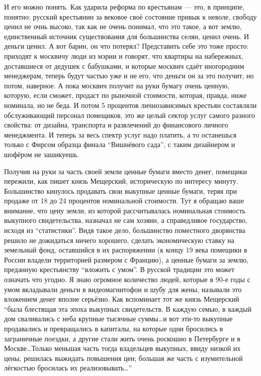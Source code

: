 И его можно понять. Как ударила реформа по крестьянам --- это, в принципе,
понятно: русский крестьянин за вековое своё состояние привык к неволе, свободу
ценил не очнь высоко, так как не очень понимал, что это такое, а вот землю,
единственный источник существования для большинства селян, ценил очень. И деньги
ценил. А вот барин, он что потерял? Представить себе это тоже просто: приходят к
москвичу люди из мэрии и говорят, что квартиры на набережных, доставшиеся от
дедушек с бабушками, и  которые москвич сдаёт иногородним менеджерам, теперь
будут частью уже и не его, что деньги он за это получит, но потом, наверное.
А пока москвич получит на руки бумагу очень ценную, которую, если сможет,
продаст по рыночной стоимости, которая, правда, ниже номинала, но не беда. И
потом 5 процентов личнозависимых крестьян составляли обслуживающий персонал
помещиков, это же целый сектор услуг самого разного свойства: от дизайна,
транспорта и развлечений до финансового личного менеджмента. И теперь за весь
спектр услуг надо платить, а то останешься только с Фирсом образца финала
\enquote{Вишнёвого сада}, с таким дизайнером и шофёром не зашикуешь.

Получив на руки за часть своей земли ценные бумаги вместо денег, помещики
пережили, как пишет князь Мещерский, историческую по интересу минуту.
Большинство кинулось продавать свои выкупные ценные бумаги, теряя при продаже
от 18 до 24 процентов номинальной стоимости. Тут я обращаю ваше внимание, что
цену земли, из которой рассчитывалась номинальная стоимость выкупного
свидетельства, назначал не сам хозяин, а справедливое государство, исходя из
\enquote{статистики}. Видя такое дело, большинство поместного дворянства решило
не дожидаться ничего хорошего, сделать экономическую ставку на земельный фонд,
оставшийся в их распоряжении (к концу 19 века помещики в России владели
территорией размером с Францию), а ценные бумаги за землю, преданную
крестьянству \enquote{вложить с умом}. В русской традиции это может означать что
угодно. Я знаю огромное количество людей, которые в 90-е годы с умом вкладывали
деньги в видеомагнитофон и шубу для жены, называли это вложением денег вполне
серьёзно. Как вспоминает тот же князь Мещерский \enquote{была блестящая эта
эпоха выкупных свидетельств. В каждую семью, в каждый дом сваливались с неба
крупные тысячные суммы\ldots и вот эти-то выкупные продавались и превращались в
капиталы, на которые одни бросились в заграничные поездки, а другие стали жить
очень роскошно в Петербурге и в Москве\ldots Только меньшая часть тогда
владельцев выкупных, ввиду низкой их цены, решилась выжидать повышения цен;
большая же часть с изумительной лёгкостью бросилась их реализовывать\ldots}

